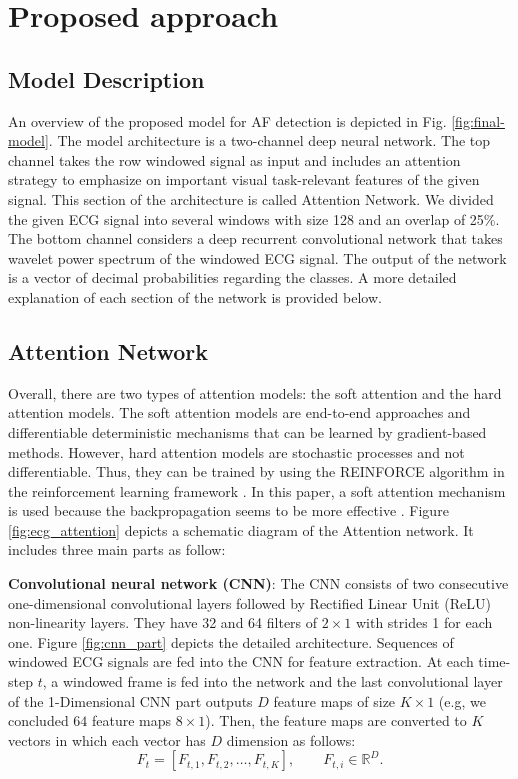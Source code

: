 \documentclass[conference]{IEEEtran}
\begin{document}
\section{Proposed approach}
\label{sec:propsed}
\subsection{Model Description}
An overview of the proposed model for AF detection is depicted in Fig. \ref{fig:final-model}. The model architecture is a two-channel deep neural network. The top channel takes the row windowed signal as input and includes an attention strategy to emphasize on important visual task-relevant features of the given signal. This section of the architecture is called Attention Network. We divided the given ECG signal into several windows with size 128 and an overlap of 25\%. The bottom channel considers a deep recurrent convolutional network that takes wavelet power spectrum of the windowed ECG signal. The output of the network is a vector of decimal probabilities regarding the classes. A more detailed explanation of each section of the network is provided below.

\subsection*{Attention Network}
Overall, there are two types of attention models: the soft attention and the hard attention models. The soft attention models are end-to-end approaches and differentiable deterministic mechanisms
that can be learned by gradient-based methods. However, hard attention models are stochastic processes and not differentiable. Thus, they can be trained by using the REINFORCE algorithm \cite{williams1992simple} in the reinforcement learning framework \cite{mousavi2016deep}.
In this paper, a soft attention mechanism is used because the backpropagation seems to be more effective  \cite{xu2015show,mousavi2016learning}. Figure \ref{fig:ecg_attention} depicts a schematic diagram  of the Attention network. It includes three main parts as follow:

\noindent\textbf{ Convolutional neural network (CNN)}: The CNN consists of two consecutive one-dimensional convolutional layers followed by Rectified Linear Unit (ReLU) non-linearity layers. They have 32 and 64 filters of $2\times1$ with strides 1 for each one. Figure \ref{fig:cnn_part} depicts the detailed architecture.  Sequences of windowed ECG signals are fed into the CNN for feature extraction. At each time-step $t$, a windowed frame is fed into the network and the last convolutional layer of the 1-Dimensional CNN part outputs $D$ feature maps of size $K\times1$ (e.g, we concluded $64$ feature maps $8\times1$).
Then, the feature maps are converted to $K$ vectors in which each vector has $D$ dimension as follows: $$F_t = [F_{t,1},F_{t,2}, \ldots ,F_{t,K}], \qquad F_{t,i}\in \mathbb{R}^D.$$
\end{document}
